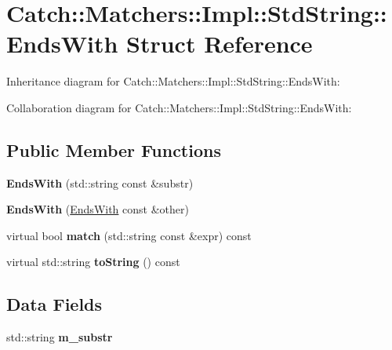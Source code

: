 \hypertarget{structCatch_1_1Matchers_1_1Impl_1_1StdString_1_1EndsWith}{}\section{Catch\+:\+:Matchers\+:\+:Impl\+:\+:Std\+String\+:\+:Ends\+With Struct Reference}
\label{structCatch_1_1Matchers_1_1Impl_1_1StdString_1_1EndsWith}


Inheritance diagram for Catch\+:\+:Matchers\+:\+:Impl\+:\+:Std\+String\+:\+:Ends\+With\+:


Collaboration diagram for Catch\+:\+:Matchers\+:\+:Impl\+:\+:Std\+String\+:\+:Ends\+With\+:
\subsection*{Public Member Functions}
\begin{DoxyCompactItemize}
\item 
{\bfseries Ends\+With} (std\+::string const \&substr)\hypertarget{structCatch_1_1Matchers_1_1Impl_1_1StdString_1_1EndsWith_a82730175f7f7475ce1ee9791e160d02d}{}\label{structCatch_1_1Matchers_1_1Impl_1_1StdString_1_1EndsWith_a82730175f7f7475ce1ee9791e160d02d}

\item 
{\bfseries Ends\+With} (\hyperlink{structCatch_1_1Matchers_1_1Impl_1_1StdString_1_1EndsWith}{Ends\+With} const \&other)\hypertarget{structCatch_1_1Matchers_1_1Impl_1_1StdString_1_1EndsWith_a9321aac07fb17613a7993e99003b3be2}{}\label{structCatch_1_1Matchers_1_1Impl_1_1StdString_1_1EndsWith_a9321aac07fb17613a7993e99003b3be2}

\item 
virtual bool {\bfseries match} (std\+::string const \&expr) const \hypertarget{structCatch_1_1Matchers_1_1Impl_1_1StdString_1_1EndsWith_ad0e03d7f54ffa5859f84faebccf11e76}{}\label{structCatch_1_1Matchers_1_1Impl_1_1StdString_1_1EndsWith_ad0e03d7f54ffa5859f84faebccf11e76}

\item 
virtual std\+::string {\bfseries to\+String} () const \hypertarget{structCatch_1_1Matchers_1_1Impl_1_1StdString_1_1EndsWith_a54715c94c215a1fc5fb6336acf52eb06}{}\label{structCatch_1_1Matchers_1_1Impl_1_1StdString_1_1EndsWith_a54715c94c215a1fc5fb6336acf52eb06}

\end{DoxyCompactItemize}
\subsection*{Data Fields}
\begin{DoxyCompactItemize}
\item 
std\+::string {\bfseries m\+\_\+substr}\hypertarget{structCatch_1_1Matchers_1_1Impl_1_1StdString_1_1EndsWith_a5abf70e94ea7893b7bd1e7b33880ba7b}{}\label{structCatch_1_1Matchers_1_1Impl_1_1StdString_1_1EndsWith_a5abf70e94ea7893b7bd1e7b33880ba7b}

\end{DoxyCompactItemize}
